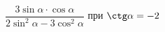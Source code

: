 \begin{ex}[type=simplify_calculate]
	\begin{condition}
		\( \dfrac{3\sin\alpha\cdot\cos\alpha}{2\sin^2\alpha-3\cos^2\alpha} \) при \( \ctg\alpha=-2 \)
	\end{condition}
\end{ex}